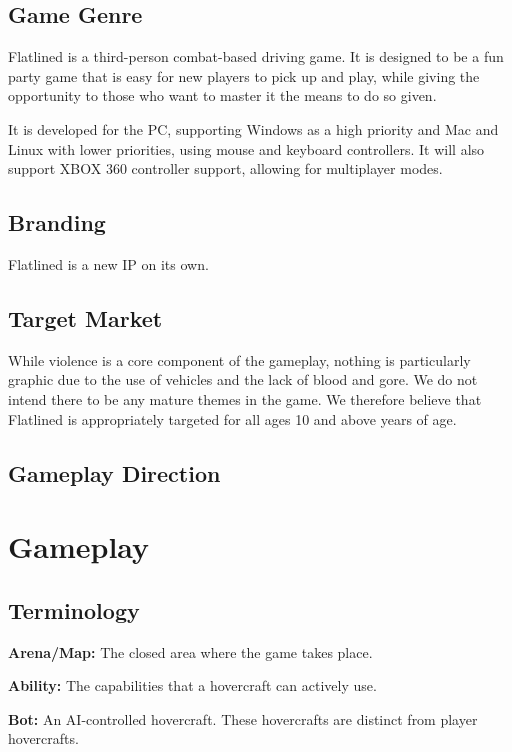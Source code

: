 \documentclass{article}
\newcommand{\name}{Flatlined}
\theoremstyle{definition}
\begin{document}
\subsection{Game Genre} %

\name{} is a third-person combat-based driving game. It is designed to be
a fun party game that is easy for new players to pick up and play, while giving
the opportunity to those who want to master it the means to do so given.

It is developed for the PC, supporting Windows as a high priority and Mac and
Linux with lower priorities, using mouse and keyboard controllers. It will also
support XBOX 360 controller support, allowing for multiplayer modes.

\subsection{Branding}

\name{} is a new IP on its own.

\subsection{Target Market}

While violence is a core component of the gameplay, nothing is particularly
graphic due to the use of vehicles and the lack of blood and gore. We do not
intend there to be any mature themes in the game. We therefore believe that
\name{} is appropriately targeted for all ages 10 and above years of age.

\subsection{Gameplay Direction} %

\section{Gameplay}

\subsection{Terminology}

\textbf{Arena/Map:} The closed area where the game takes place.

\textbf{Ability:} The capabilities that a hovercraft can actively use.

\textbf{Bot:} An AI-controlled hovercraft. These hovercrafts are distinct from
player hovercrafts.
\end{document}
